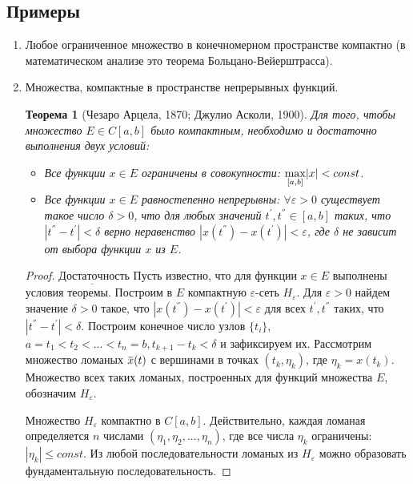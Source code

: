 \documentclass[12pt,a4paper,titlepage,oneside]{book}
\newcommand{\overbar}[1]{\mkern 1.5mu\overline{\mkern-1.5mu#1\mkern-1.5mu}\mkern 1.5mu}
\theoremstyle{definition}
\theoremstyle{plain}
\newtheorem*{theorem}{Теорема}
\theoremstyle{remark}
\theoremstyle{remark}
\theoremstyle{remark}
\theoremstyle{remark}
\theoremstyle{plain}
\theoremstyle{plain}
\begin{document}
\subsection*{Примеры}
\begin{enumerate}

	\item Любое ограниченное множество в конечномерном пространстве компактно (в математическом анализе это теорема Больцано-Вейерштрасса).

	\item Множества, компактные в пространстве непрерывных функций.

\begin{theorem} [Чезаро Арцела, 1870; Джулио Асколи, 1900]
Для того, чтобы множество $E \in C[a, b]$ было компактным, необходимо и достаточно выполнения двух условий:

\begin{itemize}

	\item  Все функции $x\in E$ ограничены в совокупности: $\smash{\displaystyle\max_{ [a,b]}} |x| < const$.

	\item  Все функции $x\in E$ равностепенно непрерывны: $\forall \varepsilon>0$ существует такое число $\delta>0$, что для любых значений $t^{'}, t^{''} \in [a, b]$ таких, что $|t^{''}-t^{'}| <\delta$ верно неравенство $|x(t^{''})-x(t^{'})| <\varepsilon$, где $\delta$ не зависит от выбора функции $x$ из $E$.
	
\end{itemize}

\end{theorem}
\begin{proof} 
	$\underbar{Достаточность}$ Пусть известно, что для функции $x\in E$ выполнены условия теоремы. Построим в $E$ компактную 	$\varepsilon$-сеть $H_{\varepsilon}$. Для 	$ \varepsilon>0$ найдем значение $\delta>0$ такое, что $|x(t^{''})-x(t^{'})| <\varepsilon$ для всех $t^{'}, t^{''}$ таких, что $|t^{''}-t^{'}| <\delta$. Построим конечное число узлов $\{t_i\}$, $a=t_1<t_2<...<t_n=b, t_{k+1}-t_k< \delta$ и зафиксируем их. Рассмотрим множество ломаных $\overbar{x}(t)$ с вершинами в точках $(t_k, \eta_k )$, где $\eta_k=x(t_k)$. Множество всех таких ломаных, построенных для функций множества $E$, обозначим $H_{\varepsilon}$.
	
	Множество $H_{\varepsilon}$ компактно в $C[a, b]$. Действительно, каждая ломаная определяется $n$ числами $(\eta_1, \eta_2,...,\eta_n )$, где все числа $\eta_k$ ограничены: $|\eta_k|\leq const$. Из любой последовательности ломаных из $H_{\varepsilon}$ можно образовать фундаментальную последовательность.
	

\end{proof}
\end{enumerate}
\end{document}
